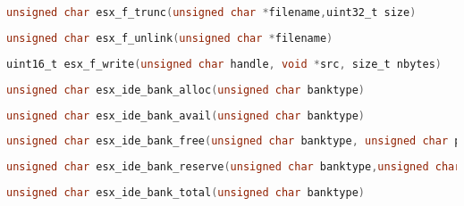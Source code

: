 \documentclass[11pt]{book}
\def\lthtmlcheckvsize{\ifdim\ht\sizebox<\vsize 
  \ifdim\wd\sizebox<\hsize\expandafter\hfill\fi \expandafter\vfill
  \else\expandafter\vss\fi}%
\begin{document}
{\newpage\clearpage
{}%
\begin{lstlisting}[language=C]
unsigned char esx_f_trunc(unsigned char *filename,uint32_t size)
\end{lstlisting}%
\lthtmlfigureZ
\lthtmlcheckvsize\clearpage}

{\newpage\clearpage
{}%
\begin{lstlisting}[language=C]
unsigned char esx_f_unlink(unsigned char *filename)
\end{lstlisting}%
\lthtmlfigureZ
\lthtmlcheckvsize\clearpage}

{\newpage\clearpage
{}%
\begin{lstlisting}[language=C]
uint16_t esx_f_write(unsigned char handle, void *src, size_t nbytes)
\end{lstlisting}%
\lthtmlfigureZ
\lthtmlcheckvsize\clearpage}

{\newpage\clearpage
{}%
\begin{lstlisting}[language=C]
unsigned char esx_ide_bank_alloc(unsigned char banktype)
\end{lstlisting}%
\lthtmlfigureZ
\lthtmlcheckvsize\clearpage}

{\newpage\clearpage
{}%
\begin{lstlisting}[language=C]
unsigned char esx_ide_bank_avail(unsigned char banktype)
\end{lstlisting}%
\lthtmlfigureZ
\lthtmlcheckvsize\clearpage}

{\newpage\clearpage
{}%
\begin{lstlisting}[language=C]
unsigned char esx_ide_bank_free(unsigned char banktype, unsigned char page)
\end{lstlisting}%
\lthtmlfigureZ
\lthtmlcheckvsize\clearpage}

{\newpage\clearpage
{}%
\begin{lstlisting}[language=C]
unsigned char esx_ide_bank_reserve(unsigned char banktype,unsigned char page)
\end{lstlisting}%
\lthtmlfigureZ
\lthtmlcheckvsize\clearpage}

{\newpage\clearpage
{}%
\begin{lstlisting}[language=C]
unsigned char esx_ide_bank_total(unsigned char banktype)
\end{lstlisting}%
\lthtmlfigureZ
\lthtmlcheckvsize\clearpage}
\end{document}

